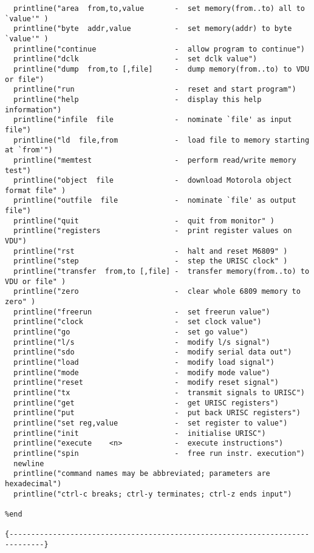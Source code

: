 \begin{verbatim}
  printline("area  from,to,value       -  set memory(from..to) all to `value'" )
  printline("byte  addr,value          -  set memory(addr) to byte `value'" )
  printline("continue                  -  allow program to continue")
  printline("dclk                      -  set dclk value")
  printline("dump  from,to [,file]     -  dump memory(from..to) to VDU or file")
  printline("run                       -  reset and start program")
  printline("help                      -  display this help information")
  printline("infile  file              -  nominate `file' as input file")
  printline("ld  file,from             -  load file to memory starting at `from'")
  printline("memtest                   -  perform read/write memory test")
  printline("object  file              -  download Motorola object format file" )
  printline("outfile  file             -  nominate `file' as output file")
  printline("quit                      -  quit from monitor" )
  printline("registers                 -  print register values on VDU")
  printline("rst                       -  halt and reset M6809" )
  printline("step                      -  step the URISC clock" )
  printline("transfer  from,to [,file] -  transfer memory(from..to) to VDU or file" )
  printline("zero                      -  clear whole 6809 memory to zero" )
  printline("freerun                   -  set freerun value")
  printline("clock                     -  set clock value")
  printline("go                        -  set go value")
  printline("l/s                       -  modify l/s signal")
  printline("sdo                       -  modify serial data out")
  printline("load                      -  modify load signal")
  printline("mode                      -  modify mode value")
  printline("reset                     -  modify reset signal")
  printline("tx                        -  transmit signals to URISC")
  printline("get                       -  get URISC registers")
  printline("put                       -  put back URISC registers")
  printline("set reg,value             -  set register to value")
  printline("init                      -  initialise URISC")
  printline("execute    <n>            -  execute instructions")
  printline("spin                      -  free run instr. execution")
  newline
  printline("command names may be abbreviated; parameters are hexadecimal")
  printline("ctrl-c breaks; ctrl-y terminates; ctrl-z ends input")

%end

{------------------------------------------------------------------------------}


\end{verbatim}
